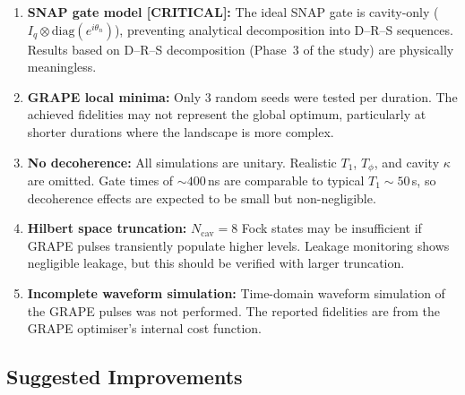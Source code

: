 \documentclass[aps,pra,twocolumn,reprint,floatfix,amsmath,amssymb]{revtex4-2}
\begin{document}
\begin{enumerate}
  \item \textbf{SNAP gate model [CRITICAL]:}
    The ideal SNAP gate is cavity-only
    ($I_q\otimes\mathrm{diag}(e^{i\theta_n})$), preventing
    analytical decomposition into D--R--S sequences.  Results based
    on D--R--S decomposition (Phase~3 of the study) are physically
    meaningless.

  \item \textbf{GRAPE local minima:}
    Only 3 random seeds were tested per duration.  The achieved
    fidelities may not represent the global optimum, particularly
    at shorter durations where the landscape is more complex.

  \item \textbf{No decoherence:}
    All simulations are unitary.  Realistic $T_1$, $T_\phi$, and
    cavity $\kappa$ are omitted.  Gate times of $\sim400$\,ns are
    comparable to typical $T_1\sim50$\,\textmu{}s, so decoherence
    effects are expected to be small but non-negligible.

  \item \textbf{Hilbert space truncation:}
    $N_\mathrm{cav}=8$ Fock states may be insufficient if GRAPE
    pulses transiently populate higher levels.  Leakage monitoring
    shows negligible leakage, but this should be verified with
    larger truncation.

  \item \textbf{Incomplete waveform simulation:}
    Time-domain waveform simulation of the GRAPE pulses was not
    performed.  The reported fidelities are from the GRAPE
    optimiser's internal cost function.
\end{enumerate}

\subsection{Suggested Improvements}
\end{document}
